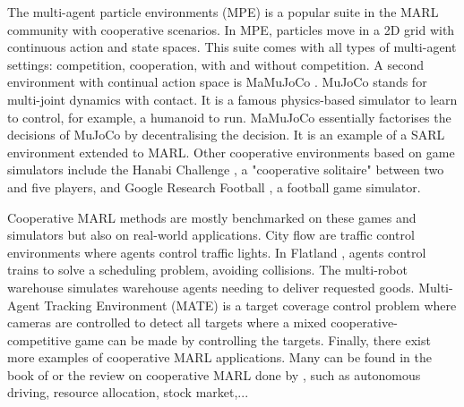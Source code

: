 The multi-agent particle environments (MPE) \citep{lowe2017multi} is a popular suite in the MARL community with cooperative scenarios.
In MPE, particles move in a 2D grid with continuous action and state spaces.
This suite comes with all types of multi-agent settings: competition, cooperation, with and without competition.
A second environment with continual action space is MaMuJoCo \citep{peng2021facmac}.
MuJoCo \citep{todorov2012mujoco} stands for multi-joint dynamics with contact.
It is a famous physics-based simulator to learn to control, for example, a humanoid to run.
MaMuJoCo essentially factorises the decisions of MuJoCo by decentralising the decision.
It is an example of a SARL environment extended to MARL.
Other cooperative environments based on game simulators include the Hanabi Challenge \citep{Bard_2020}, a "cooperative solitaire" between two and five players, and Google Research Football \citep{kurach2020google}, a football game simulator.

Cooperative MARL methods are mostly benchmarked on these games and simulators but also on real-world applications.
City flow \citep{zhang2019cityflow} are traffic control environments where agents control traffic lights.
In Flatland \citep{mohanty2020flatland}, agents control trains to solve a scheduling problem, avoiding collisions.
The multi-robot warehouse \citep{papoudakis2021benchmarking, christianos2020shared} simulates warehouse agents needing to deliver requested goods.
Multi-Agent Tracking Environment (MATE) \citep{NEURIPS2022_b2a1c152} is a target coverage control problem where cameras are controlled to detect all targets where a mixed cooperative-competitive game can be made by controlling the targets.
Finally, there exist more examples of cooperative MARL applications.
Many can be found in the book of \cite{marl-book} or the review on cooperative MARL done by \cite{oroojlooy2022review}, such as autonomous driving, resource allocation, stock market,...

